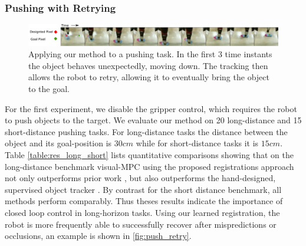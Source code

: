 \subsubsection{Pushing with Retrying}
\begin{figure}
    \centering
    \includegraphics[width=1.0\textwidth]{images_rfr/push_correction.pdf}
    \caption{\small{Applying our method to a pushing task. In the first 3 time instants the object behaves unexpectedly, moving down. The tracking then allows the robot to retry, allowing it to eventually bring the object to the goal.}}
    \label{fig:push_retry}
\end{figure}



For the first experiment, we disable the gripper control, which requires the robot to push objects to the target. We evaluate our method on 20 long-distance and 15 short-distance pushing tasks. For long-distance tasks the distance between the object and its goal-position is $30cm$ while for short-distance tasks it is $15cm$. Table \ref{table:res_long_short} lists quantitative comparisons showing that on the long-distance benchmark visual-MPC using the proposed registrations approach not only outperforms prior work \cite{sna}, but also outperforms the hand-designed, supervised object tracker \cite{babenko2009visual}. By contrast for the short distance benchmark, all methods perform comparably. Thus theses results indicate the importance of closed loop control in long-horizon tasks. Using our learned registration, the robot is more frequently able to successfully recover after mispredictions or occlusions, an example is shown in \autoref{fig:push_retry}. 


